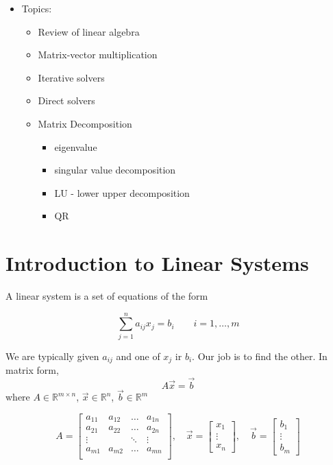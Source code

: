 \documentclass{article}
\begin{document}
\begin{itemize}[label={}]
  \item Topics:
    \begin{itemize}[label={--}]
        \item Review of linear algebra
        \item Matrix-vector multiplication
        \item Iterative solvers
        \item Direct solvers
        \item Matrix Decomposition
            \begin{itemize}
                \item eigenvalue
                \item singular value decomposition
                \item LU - lower upper decomposition
                \item QR
            \end{itemize}
    \end{itemize}
    
\end{itemize}

\section{Introduction to Linear Systems}

A linear system is a set of equations of the form 

\begin{equation}
    \sum_{j=1}^n a_{ij} x_j  = b_i \qquad i=1, \ldots, m
\end{equation}

We are typically given $a_{ij}$ and one of $x_j$ ir $b_i$. Our job is to find the other. In matrix form, 
\begin{equation}
    A \Vec{x} = \Vec{b}
\end{equation}
where $A \in \mathbb{R}^{m \times n}$, $\Vec{x}\in \mathbb{R}^{n}$, $\Vec{b}\in \mathbb{R}^{m}$

\begin{equation}
    A = 
    \begin{bmatrix}
    a_{11} & a_{12} & \ldots & a_{1n}\\
    a_{21} & a_{22} & \ldots & a_{2n}\\
    \vdots &  & \ddots & \vdots\\
    a_{m1} & a_{m2} & \ldots & a_{mn}\\
    \end{bmatrix}
    ,\quad
    \Vec{x}  = \begin{bmatrix}x_1\\\vdots\\x_n\end{bmatrix}
    ,\quad
    \Vec{b}  = \begin{bmatrix}b_1\\\vdots\\b_m\end{bmatrix}
\end{equation}
\end{document}
